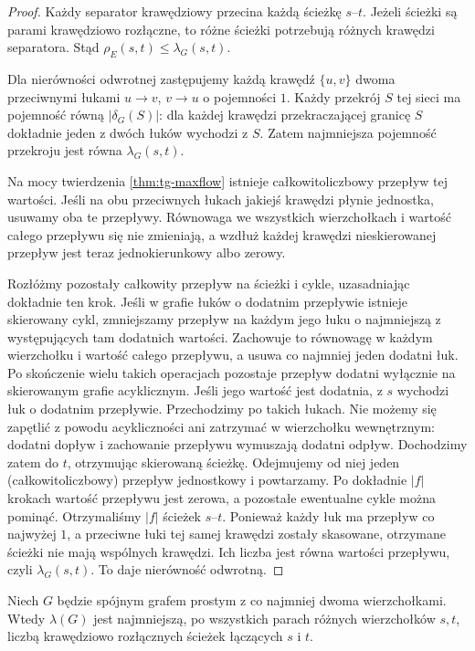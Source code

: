 \begin{proof}
Każdy separator krawędziowy przecina każdą ścieżkę
$s$--$t$. Jeżeli ścieżki są parami krawędziowo rozłączne,
to różne ścieżki potrzebują różnych krawędzi separatora.
Stąd $\rho_E(s,t)\le\lambda_G(s,t)$.

Dla nierówności odwrotnej zastępujemy każdą krawędź
$\{u,v\}$ dwoma przeciwnymi łukami $u\to v$, $v\to u$
o pojemności $1$. Każdy przekrój $S$ tej sieci ma
pojemność równą $|\delta_G(S)|$: dla każdej krawędzi
przekraczającej granicę $S$ dokładnie jeden z dwóch
łuków wychodzi z $S$. Zatem najmniejsza pojemność
przekroju jest równa $\lambda_G(s,t)$.

Na mocy twierdzenia \ref{thm:tg-maxflow} istnieje
całkowitoliczbowy przepływ tej wartości. Jeśli na
obu przeciwnych łukach jakiejś krawędzi płynie
jednostka, usuwamy oba te przepływy. Równowaga
we wszystkich wierzchołkach i wartość całego
przepływu się nie zmieniają, a wzdłuż każdej
krawędzi nieskierowanej przepływ jest teraz
jednokierunkowy albo zerowy.

Rozłóżmy pozostały całkowity przepływ na ścieżki
i cykle, uzasadniając dokładnie ten krok. Jeśli w grafie
łuków o dodatnim przepływie istnieje skierowany cykl,
zmniejszamy przepływ na każdym jego łuku o najmniejszą
z występujących tam dodatnich wartości. Zachowuje to
równowagę w każdym wierzchołku i wartość całego przepływu,
a usuwa co najmniej jeden dodatni łuk. Po skończenie wielu
takich operacjach pozostaje przepływ dodatni wyłącznie
na skierowanym grafie acyklicznym.
Jeśli jego wartość jest dodatnia, z $s$ wychodzi łuk
o dodatnim przepływie. Przechodzimy po takich łukach.
Nie możemy się zapętlić z powodu acykliczności ani
zatrzymać w wierzchołku wewnętrznym: dodatni dopływ
i zachowanie przepływu wymuszają dodatni odpływ.
Dochodzimy zatem do $t$, otrzymując skierowaną ścieżkę.
Odejmujemy od niej jeden (całkowitoliczbowy) przepływ
jednostkowy i powtarzamy. Po dokładnie $|f|$ krokach
wartość przepływu jest zerowa, a pozostałe ewentualne
cykle można pominąć. Otrzymaliśmy $|f|$ ścieżek $s$--$t$.
Ponieważ każdy łuk ma przepływ co najwyżej $1$,
a przeciwne łuki tej samej krawędzi zostały skasowane,
otrzymane ścieżki nie mają wspólnych krawędzi.
Ich liczba jest równa wartości przepływu,
czyli $\lambda_G(s,t)$. To daje nierówność odwrotną.
\end{proof}

\begin{wniosek}
Niech $G$ będzie spójnym grafem prostym z co najmniej
dwoma wierzchołkami. Wtedy $\lambda(G)$ jest najmniejszą,
po wszystkich parach różnych wierzchołków $s,t$,
liczbą krawędziowo rozłącznych ścieżek łączących $s$ i $t$.
\end{wniosek}

